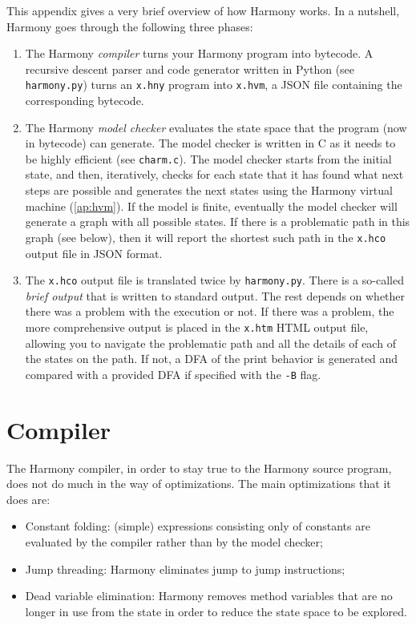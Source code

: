 \documentclass{report}
\begin{document}
This appendix gives a very brief overview of how Harmony works.
In a nutshell, Harmony goes through the following three phases:

\begin{enumerate}
\item The Harmony \emph{compiler} turns your Harmony program into
bytecode.  A recursive descent parser and code generator written in
Python (see \texttt{harmony.py}) turns an \texttt{x.hny} program
into \texttt{x.hvm}, a JSON file containing the corresponding
bytecode.
\item The Harmony \emph{model checker} evaluates the state space
that the program (now in bytecode) can generate.  The model checker
is written in C as it needs to be highly efficient (see \texttt{charm.c}).
The model checker starts from the initial state, and then, iteratively,
checks for each state that it has found what next steps are possible and
generates the next states using the Harmony virtual machine
(\autoref{ap:hvm}).  If the model is finite, eventually the model
checker will generate a graph with all possible states.
If there is a problematic path in this graph (see below), then it will
report the shortest such path in the \texttt{x.hco} output file in JSON
format.
\item The \texttt{x.hco} output file is translated twice by
\texttt{harmony.py}.  There is a so-called \emph{brief output} that
is written to standard output.  The rest depends on whether there was
a problem with the execution or not.  If there was a problem, the more
comprehensive output is placed in the \texttt{x.htm} HTML output file,
allowing you to navigate the problematic path and all the details of
each of the states on the path.  If not, a DFA of the print behavior
is generated and compared with a provided DFA if specified with the
\texttt{-B} flag.
\end{enumerate}

\section{Compiler}

The Harmony compiler, in order to stay true to the Harmony source program,
does not do much in the way of optimizations.  The main optimizations that
it does are:

\begin{itemize}
\item Constant folding: (simple) expressions consisting only of constants
are evaluated by the compiler rather than by the model checker;
\item Jump threading: Harmony eliminates jump to jump instructions;
\item Dead variable elimination: Harmony removes method variables that
are no longer in use from the state in order to reduce the state space
to be explored.
\end{itemize}
\end{document}
